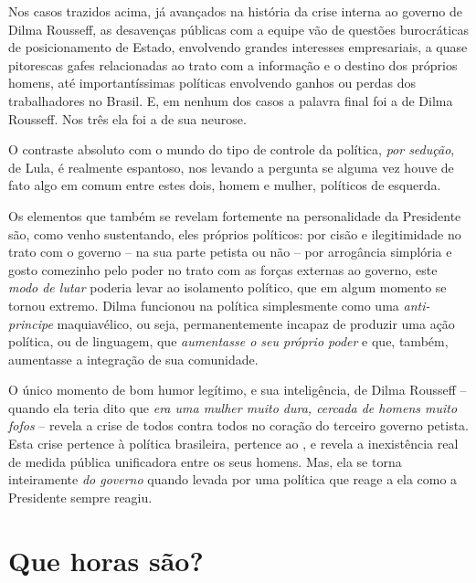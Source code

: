 Nos casos trazidos acima, já avançados na história da crise interna ao
governo de Dilma Rousseff, as desavenças públicas com a equipe vão de
questões burocráticas de posicionamento de Estado, envolvendo grandes
interesses empresariais, a quase pitorescas gafes relacionadas ao trato
com a informação e o destino dos próprios homens, até importantíssimas
políticas envolvendo ganhos ou perdas dos trabalhadores no Brasil. E, em
nenhum dos casos a palavra final foi a de Dilma Rousseff. Nos três ela
foi a de sua neurose.

O contraste absoluto com o mundo do tipo de controle da política,
\emph{por sedução}, de Lula, é realmente espantoso, nos levando a
pergunta se alguma vez houve de fato algo em comum entre estes dois,
homem e mulher, políticos de esquerda.

Os elementos que também se revelam fortemente na personalidade da
Presidente são, como venho sustentando, eles próprios políticos: por
cisão e ilegitimidade no trato com o governo -- na sua parte petista ou
não -- por arrogância simplória e gosto comezinho pelo poder no trato
com as forças externas ao governo, este \emph{modo de lutar} poderia
levar ao isolamento político, que em algum momento se tornou extremo.
Dilma funcionou na política simplesmente como uma \emph{anti-principe}
maquiavélico, ou seja, permanentemente incapaz de produzir uma ação
política, ou de linguagem, que \emph{aumentasse o seu próprio poder} e
que, também, aumentasse a integração de sua comunidade.

O único momento de bom humor legítimo, e sua inteligência, de Dilma
Rousseff -- quando ela teria dito que \emph{era uma mulher muito dura,
cercada de homens muito fofos} -- revela a crise de todos contra todos
no coração do terceiro governo petista. Esta crise pertence à política
brasileira, pertence ao , e revela a inexistência real de medida
pública unificadora entre os seus homens. Mas, ela se torna inteiramente
\emph{do governo} quando levada por uma política que reage a ela como a
Presidente sempre reagiu.

  \section{Que horas são?}\label{que-horas-suxe3o}

